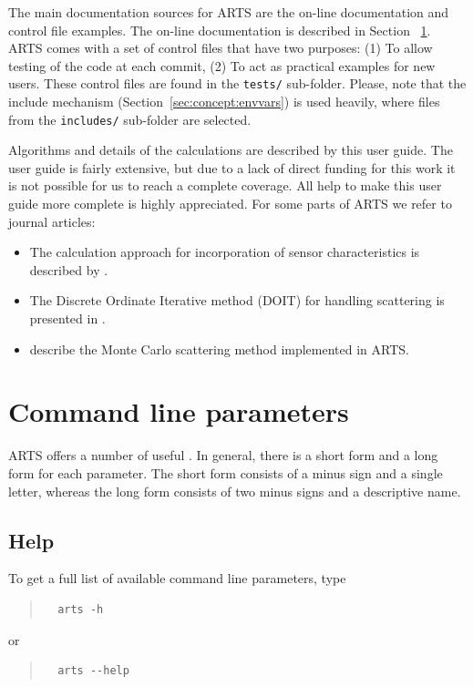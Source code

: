 The main documentation sources for ARTS are the on-line documentation
and control file examples. The on-line documentation is described in
Section ~\ref{sec:concept:comline}. ARTS comes with a set of control
files that have two purposes: (1) To allow testing of the code at each
commit, (2) To act as practical examples for new users. These control
files are found in the \verb|tests/| sub-folder. Please, note that the
include mechanism (Section~\ref{sec:concept:envvars}) is used heavily,
where files from the \verb|includes/| sub-folder are selected.

Algorithms and details of the calculations are described by this user
guide. The user guide is fairly extensive, but due to a lack of direct
funding for this work it is not possible for us to reach a complete
coverage. All help to make this user guide more complete is highly
appreciated. For some parts of ARTS we refer to journal articles:
\begin{itemize}
\item The calculation approach for incorporation of sensor
  characteristics is described by \citet{eriksson:06}.
\item The Discrete Ordinate Iterative method (DOIT) for handling scattering
  is presented in \citet{emde04:_doit_jgr}.
\item \citet{davisetal:04} describe the Monte Carlo scattering method
  implemented in ARTS.
\end{itemize}



\section{Command line parameters}
\label{sec:concept:comline}

ARTS offers a number of useful . In
general, there is a short form and a long form for each parameter. The
short form consists of a minus sign and a single letter, whereas the
long form consists of two minus signs and a descriptive name.

\subsection*{Help}
%
To get a full list of available command line parameters, type
\begin{quote}
\begin{verbatim}
  arts -h
\end{verbatim}
\end{quote}
or
\begin{quote}
\begin{verbatim}
  arts --help
\end{verbatim}
\end{quote}


